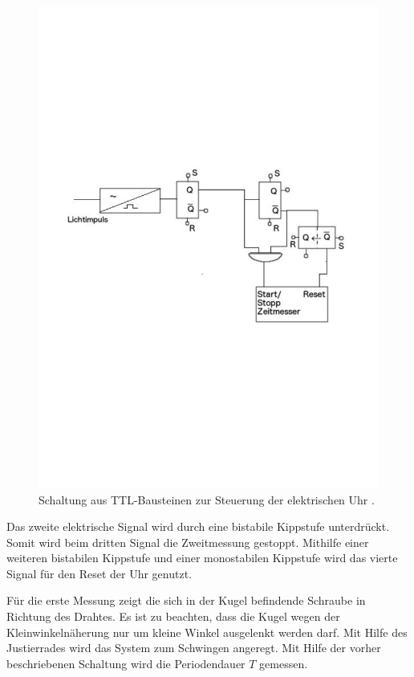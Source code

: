 \begin{figure}
  \centering
  \includegraphics[scale=0.5]{bilder/schaltung-TTL.pdf}
\caption{Schaltung aus TTL-Bausteinen zur Steuerung der elektrischen Uhr \cite{anleitung102}.}
  \label{fig:TTL}
\end{figure}

Das zweite elektrische Signal wird durch eine bistabile Kippstufe unterdrückt. Somit wird beim dritten Signal die Zweitmessung gestoppt. Mithilfe einer weiteren bistabilen Kippstufe und einer monostabilen Kippstufe wird das vierte Signal für den Reset der Uhr genutzt.

Für die erste Messung zeigt die sich in der Kugel befindende Schraube in Richtung des Drahtes. Es ist zu beachten, dass die Kugel wegen der Kleinwinkelnäherung nur um kleine Winkel ausgelenkt werden darf. Mit Hilfe des Justierrades wird das System zum Schwingen angeregt. Mit Hilfe der vorher beschriebenen Schaltung wird die Periodendauer $T$ gemessen.

